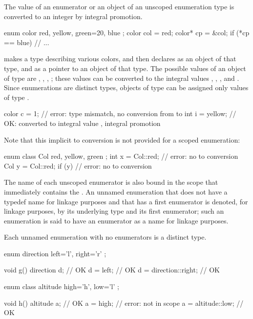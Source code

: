 \pnum
The value of an enumerator or an object of an unscoped enumeration type is
converted to an integer by integral promotion.
\begin{example}
\begin{codeblock}
enum color { red, yellow, green=20, blue };
color col = red;
color* cp = &col;
if (*cp == blue)                // ...
\end{codeblock}
makes  a type describing various colors, and then declares
 as an object of that type, and  as a pointer to an
object of that type. The possible values of an object of type
 are , , ,
; these values can be converted to the integral values
, , , and . Since enumerations are
distinct types, objects of type  can be assigned only
values of type .
\begin{codeblock}
color c = 1;                    // error: type mismatch, no conversion from  to 
int i = yellow;                 // OK:  converted to integral value , integral promotion
\end{codeblock}
Note that this implicit  to 
conversion is not provided for a scoped enumeration:
\begin{codeblock}
enum class Col { red, yellow, green };
int x = Col::red;               // error: no  to  conversion
Col y = Col::red;
if (y) { }                      // error: no  to  conversion
\end{codeblock}
\end{example}

\pnum
{}%
The name of each unscoped enumerator is also bound
in the scope that immediately contains the .
An unnamed enumeration
that does not have a typedef name for linkage purposes and
that has a first enumerator
is denoted, for linkage purposes,
by its underlying type and its first enumerator;
such an enumeration is said to have
an enumerator as a name for linkage purposes.
\begin{note}
Each unnamed enumeration with no enumerators is a distinct type.
\end{note}
\begin{example}
\begin{codeblock}
enum direction { left='l', right='r' };

void g()  {
  direction d;                  // OK
  d = left;                     // OK
  d = direction::right;         // OK
}

enum class altitude { high='h', low='l' };

void h()  {
  altitude a;                   // OK
  a = high;                     // error:  not in scope
  a = altitude::low;            // OK
}
\end{codeblock}
\end{example}

